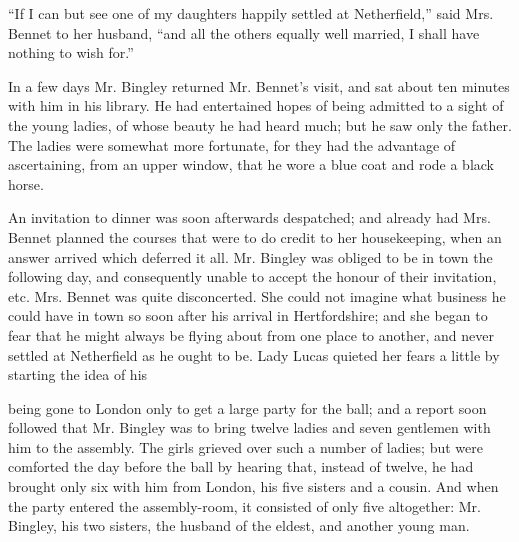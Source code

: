 ``If I can but see one of my daughters happily settled at Netherfield,'' said Mrs. Bennet to her husband, ``and all the others equally well married, I shall have nothing to wish for.''

In a few days Mr. Bingley returned Mr. Bennet's visit, and sat about ten minutes with him in his library. He had entertained hopes of being admitted to a sight of the young ladies, of whose beauty he had heard much; but he saw only the father. The ladies were somewhat more fortunate, for they had the advantage of ascertaining, from an upper window, that he wore a blue coat and rode a black horse.


An invitation to dinner was soon afterwards despatched; and already had Mrs. Bennet planned the courses that were to do credit to her housekeeping, when an answer arrived which deferred it all. Mr. Bingley was obliged to be in town the following day, and consequently unable to accept the honour of their invitation, etc. Mrs. Bennet was quite disconcerted. She could not imagine what business he could have in town so soon after his arrival in Hertfordshire; and she began to fear that he might always be flying about from one place to another, and never settled at Netherfield as he ought to be. Lady Lucas quieted her fears a little by starting the idea of his


being gone to London only to get a large party for the ball; and a report soon followed that Mr. Bingley was to bring twelve ladies and seven gentlemen with him to the assembly. The girls grieved over such a number of ladies; but were comforted the day before the ball by hearing that, instead of twelve, he had brought only six with him from London, his five sisters and a cousin. And when the party entered the assembly-room, it consisted of only five altogether: Mr. Bingley, his two sisters, the husband of the eldest, and another young man.

